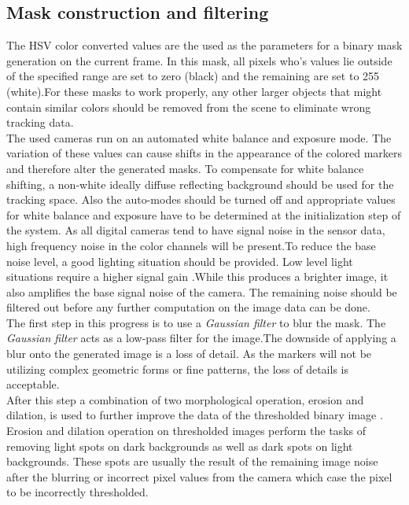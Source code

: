 \subsection{Mask construction and filtering}
The HSV color converted values are the used as the parameters for a binary mask generation on the current frame. In this mask, all pixels who's values lie outside of the specified range are set to zero (black) and the remaining are set to 255 (white).For these masks to work properly, any other larger objects that might contain similar colors should be removed from the scene to eliminate wrong tracking data. \\The used cameras run on an automated white balance and exposure mode. The variation of these values can cause shifts in the appearance of the colored markers and therefore alter the generated masks. To compensate for white balance shifting, a non-white ideally diffuse reflecting background should be used for the tracking space. Also the auto-modes should be turned off and appropriate values for white balance and exposure have to be determined at the initialization step of the system. As all digital cameras tend to have signal noise in the sensor data, high frequency noise in the color channels will be present.To reduce the base noise level, a good lighting situation should be provided. Low level light situations require a higher signal gain .While this produces a brighter image, it also amplifies the base signal noise of the camera. The remaining noise should be filtered out before any further computation on the image data can be done.\\
The first step in this progress is to use a \textit{Gaussian filter} to blur the mask.
The \textit{Gaussian filter} acts as a low-pass filter for the image.The downside of applying a blur onto the generated image is a loss of detail. As the markers will not be utilizing complex geometric forms or fine patterns, the loss of details is acceptable.\\
After this step a combination of two morphological operation, erosion and dilation, is used to further improve the data of the thresholded binary image \cite[chapter~3.11-12]{Davies.2017}.
Erosion and dilation operation on thresholded images perform the tasks of removing light spots on dark backgrounds as well as dark spots on light backgrounds. These spots are usually the result of the remaining image noise after the blurring or incorrect pixel values from the camera which case the pixel to be incorrectly thresholded.\\
